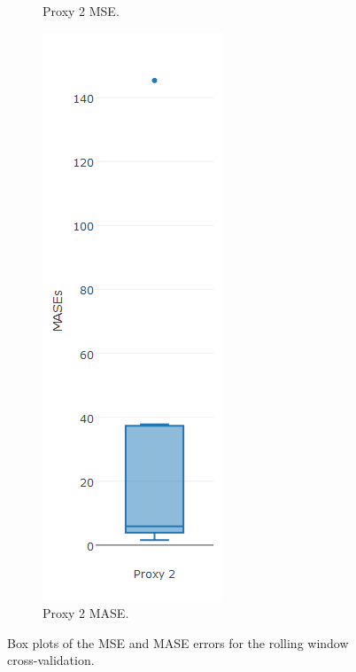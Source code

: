 \begin{figure}[!h]
{\begin{subfigure}{.25\linewidth}
  \caption{Proxy 2 MSE.}
  \label{fig:bp2.3c}
\end{subfigure}
\begin{subfigure}{.25\linewidth}
  \centering
  \includegraphics[width=\linewidth]{img/10ymaMasebpNaive.png}
  \caption{Proxy 2 MASE.}
  \label{fig:bp2.4c}
\end{subfigure}}
\caption{Box plots of the MSE and MASE errors for the rolling window cross-validation.}
\end{figure}
